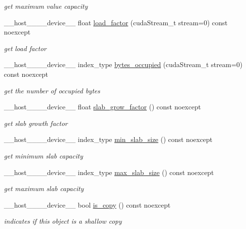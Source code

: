 \begin{DoxyCompactItemize}
\begin{DoxyCompactList}\small\item\em get maximum value capacity \end{DoxyCompactList}\item 
\+\_\+\+\_\+host\+\_\+\+\_\+\+\_\+\+\_\+device\+\_\+\+\_\+ float \hyperlink{classwarpcore_1_1storage_1_1multi__value_1_1DynamicSlabListStore_ab9e38febbac249da5662580311a76f06}{load\+\_\+factor} (cuda\+Stream\+\_\+t stream=0) const noexcept
\begin{DoxyCompactList}\small\item\em get load factor \end{DoxyCompactList}\item 
\+\_\+\+\_\+host\+\_\+\+\_\+\+\_\+\+\_\+device\+\_\+\+\_\+ index\+\_\+type \hyperlink{classwarpcore_1_1storage_1_1multi__value_1_1DynamicSlabListStore_a98fbded6fb4603336d5ea64b6e01aec9}{bytes\+\_\+occupied} (cuda\+Stream\+\_\+t stream=0) const noexcept
\begin{DoxyCompactList}\small\item\em get the number of occupied bytes \end{DoxyCompactList}\item 
\+\_\+\+\_\+host\+\_\+\+\_\+\+\_\+\+\_\+device\+\_\+\+\_\+ float \hyperlink{classwarpcore_1_1storage_1_1multi__value_1_1DynamicSlabListStore_a79fb2a41f22cf59f4edf49c3de82d9dd}{slab\+\_\+grow\+\_\+factor} () const noexcept
\begin{DoxyCompactList}\small\item\em get slab growth factor \end{DoxyCompactList}\item 
\+\_\+\+\_\+host\+\_\+\+\_\+\+\_\+\+\_\+device\+\_\+\+\_\+ index\+\_\+type \hyperlink{classwarpcore_1_1storage_1_1multi__value_1_1DynamicSlabListStore_adb7da0e5836a0274de92f906acaf7a43}{min\+\_\+slab\+\_\+size} () const noexcept
\begin{DoxyCompactList}\small\item\em get minimum slab capacity \end{DoxyCompactList}\item 
\+\_\+\+\_\+host\+\_\+\+\_\+\+\_\+\+\_\+device\+\_\+\+\_\+ index\+\_\+type \hyperlink{classwarpcore_1_1storage_1_1multi__value_1_1DynamicSlabListStore_a58f11e19acf684db903b7985364ec73c}{max\+\_\+slab\+\_\+size} () const noexcept
\begin{DoxyCompactList}\small\item\em get maximum slab capacity \end{DoxyCompactList}\item 
\+\_\+\+\_\+host\+\_\+\+\_\+\+\_\+\+\_\+device\+\_\+\+\_\+ bool \hyperlink{classwarpcore_1_1storage_1_1multi__value_1_1DynamicSlabListStore_ac26c2496f6c97b1f9ecbd64baa3b8496}{is\+\_\+copy} () const noexcept
\begin{DoxyCompactList}\small\item\em indicates if this object is a shallow copy \end{DoxyCompactList}\end{DoxyCompactItemize}
